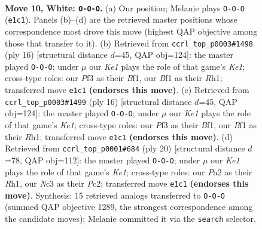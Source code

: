 \documentclass[11pt]{article}
\begin{document}
\begin{figure}[p]\centering
\begin{subfigure}{0.46\textwidth}\centering
\resizebox{\linewidth}{!}{%
\newchessgame
\chessboard[
  setfen={r2qk2r/ppp1bppp/2bp1n2/8/3QP1P1/2N1BP2/PPP4P/R3KB1R w KQkq - 1 10},
  showmover=false,
  pgfstyle=straightmove, color=movearrow, markmove={e1-c1}
]}
\caption{}
\end{subfigure}\hfill
\begin{subfigure}{0.46\textwidth}\centering
\resizebox{\linewidth}{!}{%
\newchessgame
\chessboard[
  setfen={r1bqk2r/pp2ppbp/3p1np1/8/3QP3/2N1BP2/PPP3PP/R3KB1R w KQkq - 2 9},
  showmover=false,
  pgfstyle=straightmove, color=movearrow, markmove={e1-c1}
]}
\caption{}
\end{subfigure}
\\[4pt]
\begin{subfigure}{0.46\textwidth}\centering
\resizebox{\linewidth}{!}{%
\newchessgame
\chessboard[
  setfen={r1bqk2r/pp2ppbp/3p1np1/8/3QP3/2N1BP2/PPP3PP/R3KB1R w KQkq - 2 9},
  showmover=false,
  pgfstyle=straightmove, color=movearrow, markmove={e1-c1}
]}
\caption{}
\end{subfigure}\hfill
\begin{subfigure}{0.46\textwidth}\centering
\resizebox{\linewidth}{!}{%
\newchessgame
\chessboard[
  setfen={r1bq1rk1/1p2bppp/p2ppn2/8/3QPP2/2N1B3/PPP1B1PP/R3K2R w KQ - 1 11},
  showmover=false,
  pgfstyle=straightmove, color=movearrow, markmove={e1-c1}
]}
\caption{}
\end{subfigure}
\caption{\textbf{Move 10, White: \texttt{O-O-O}.} (a) Our position; Melanie plays \texttt{O-O-O} (\texttt{e1c1}). Panels (b)--(d) are the retrieved master positions whose correspondence most drove this move (highest QAP objective among those that transfer to it). (b) Retrieved from \texttt{ccrl\_top\_p0003\#1498} (ply 16) [structural distance $d$=45, QAP obj=124]: the master played \texttt{O-O-O}; under $\mu$ our \emph{Ke1} plays the role of that game's \emph{Ke1}; cross-type roles: our \emph{P}f3 as their \emph{B}f1, our \emph{B}f1 as their \emph{R}h1; transferred move \texttt{e1c1} \textbf{(endorses this move)}. (c) Retrieved from \texttt{ccrl\_top\_p0003\#1499} (ply 16) [structural distance $d$=45, QAP obj=124]: the master played \texttt{O-O-O}; under $\mu$ our \emph{Ke1} plays the role of that game's \emph{Ke1}; cross-type roles: our \emph{P}f3 as their \emph{B}f1, our \emph{B}f1 as their \emph{R}h1; transferred move \texttt{e1c1} \textbf{(endorses this move)}. (d) Retrieved from \texttt{ccrl\_top\_p0001\#684} (ply 20) [structural distance $d$=78, QAP obj=112]: the master played \texttt{O-O-O}; under $\mu$ our \emph{Ke1} plays the role of that game's \emph{Ke1}; cross-type roles: our \emph{P}a2 as their \emph{R}h1, our \emph{N}c3 as their \emph{P}c2; transferred move \texttt{e1c1} \textbf{(endorses this move)}. Synthesis: 15 retrieved analogs transferred to \texttt{O-O-O} (summed QAP objective 1289, the strongest correspondence among the candidate moves); Melanie committed it via the \texttt{search} selector.}
\label{fig:thought-m18}
\end{figure}
\end{document}
